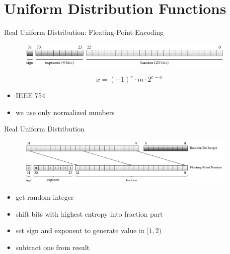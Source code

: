 \documentclass[aspectratio=169]{beamer}
\begin{document}
    \section{Uniform Distribution Functions}
    \begin{frame}{Real Uniform Distribution: Floating-Point Encoding}
      \begin{figure}
        \includegraphics[width=0.95\textwidth]{figures/floating-point_encoding_single.pdf}
      \end{figure}
      \begin{mybox}
        \[
          x = (-1)^s \cdot m \cdot 2^{e - o}
        \]
      \end{mybox}
      \begin{itemize}
        \item IEEE 754
        \item we use only normalized numbers
      \end{itemize}
    \end{frame}

    \begin{frame}{Real Uniform Distribution}
      \begin{figure}
        \includegraphics[width=0.95\textwidth]{figures/uniform_implementation_scheme.pdf}
      \end{figure}
      \begin{itemize}
        \pause
        \item get random integer
        \pause
        \item shift bits with highest entropy into fraction part
        \pause
        \item set sign and exponent to generate value in $[1,2)$
        \pause
        \item subtract one from result
      \end{itemize}
    \end{frame}
\end{document}
